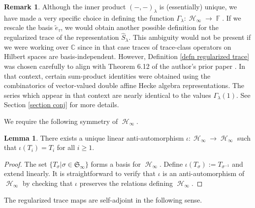 \documentclass[12pt,reqno]{amsart}
\theoremstyle{definition}
\newtheorem{lem}[thm]{Lemma}
\newtheorem{remark}{Remark}
\DeclareMathOperator{\bF}{\mathbb{F}}
\DeclareMathOperator{\cH}{\mathcal{H}}
\begin{document}
\begin{remark}\label{remark vector-valued}
    Although the inner product $(-,-)_{\lambda}$ is (essentially) unique, we have made a very specific choice in defining the function $\Gamma_{\lambda}: \cH_{\infty} \rightarrow \bF.$ If we rescale the basis $\tilde{e}_{\tau}$, we would obtain another possible definition for the regularized trace of the representation $\hat{S}_{\lambda}.$ This ambiguity would not be present if we were working over $\mathbb{C}$ since in that case traces of trace-class operators on Hilbert spaces are basis-independent. However, Definition \ref{defn regularized trace} was chosen carefully to align with Theorem 6.12 of the author's prior paper \cite{BWMurnaghan}. In that context, certain sum-product identities were obtained using the combinatorics of vector-valued double affine Hecke algebra representations. The series which appear in that context are nearly identical to the values $\Gamma_{\lambda}(1).$ See Section \ref{section conj} for more details.
\end{remark}

We require the following symmetry of $\cH_{\infty}.$

\begin{lem}
    There exists a unique linear anti-automorphism $\iota: \cH_{\infty} \rightarrow \cH_{\infty}$ such that $\iota(T_i) = T_{i}$ for all $i \geq 1.$
\end{lem}
\begin{proof}
    The set $\{T_{\sigma}| \sigma \in \mathfrak{S}_{\infty}\}$ forms a basis for $\cH_{\infty}.$ Define $\iota(T_{\sigma}):= T_{\sigma^{-1}}$ and extend linearly. It is straightforward to verify that $\iota$ is an anti-automorphism of $\cH_{\infty}$ by checking that $\iota$ preserves the relations defining $\cH_{\infty}.$
\end{proof}

The regularized trace maps are self-adjoint in the following sense.
\end{document}

